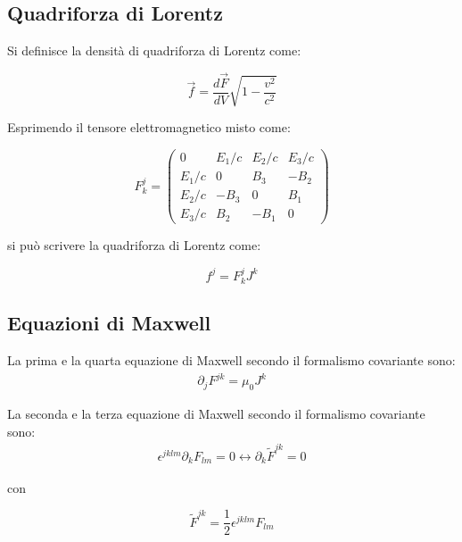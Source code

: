 \documentclass{article}
\begin{document}
\subsection*{Quadriforza di Lorentz}

Si definisce la densità di quadriforza di Lorentz come:

\begin{equation}
    \vec{f}=\frac{d \vec{F}}{dV}\sqrt{1-\frac{v^2}{c^2}}
\end{equation}

Esprimendo il tensore elettromagnetico misto come:

\begin{equation}
    F^j_k=
    \begin{pmatrix}
    0 & E_1/c & E_2/c & E_3/c \\
    E_1/c & 0 & B_3 & -B_2 \\
    E_2/c & -B_3 & 0 & B_1 \\
    E_3/c & B_2 & -B_1 & 0
    \end{pmatrix}
\end{equation}

si può scrivere la quadriforza di Lorentz come:

\begin{equation}
    f^j=F^j_k J^k
\end{equation}

\subsection{Equazioni di Maxwell}

La prima e la quarta equazione di Maxwell secondo il formalismo covariante sono:
\begin{equation}
    \begin{aligned}
         \partial_j F^{jk}=\mu_0 J^k
    \end{aligned}
\end{equation}

La seconda e la terza equazione di Maxwell secondo il formalismo covariante sono:
\begin{equation}
    \begin{aligned}
         \epsilon^{jklm}\partial_k F_{lm}=0 \leftrightarrow \partial_k \tilde F^{jk}=0
    \end{aligned}
\end{equation}

con

\begin{equation}
    \tilde F^{jk}=\frac{1}{2}\epsilon^{jklm}F_{lm}
\end{equation}
\end{document}
